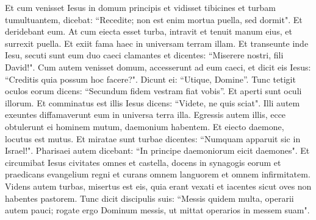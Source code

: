 \begin{biblechapter}
\verse Et cum venisset Iesus in domum principis et vidisset tibicines et turbam tumultuantem, 
\verse dicebat: “Recedite; non est enim mortua puella, sed dormit". Et deridebant eum. 
\verse At cum eiecta esset turba, intravit et tenuit manum eius, et surrexit puella. 
\verse Et exiit fama haec in universam terram illam. 
\verse Et transeunte inde Iesu, secuti sunt eum duo caeci clamantes et dicentes: “Miserere nostri, fili David!". 
\verse Cum autem venisset domum, accesserunt ad eum caeci, et dicit eis Iesus: “Creditis quia possum hoc facere?". Dicunt ei: “Utique, Domine”. 
\verse Tunc tetigit oculos eorum dicens: “Secundum fidem vestram fiat vobis”. 
\verse Et aperti sunt oculi illorum. Et comminatus est illis Iesus dicens: “Videte, ne quis sciat". 
\verse Illi autem exeuntes diffamaverunt eum in universa terra illa. 
\verse Egressis autem illis, ecce obtulerunt ei hominem mutum, daemonium habentem. 
\verse Et eiecto daemone, locutus est mutus. Et miratae sunt turbae dicentes: “Numquam apparuit sic in Israel!". 
\verse Pharisaei autem dicebant: “In principe daemoniorum eicit daemones". 
\verse Et circumibat Iesus civitates omnes et castella, docens in synagogis eorum et praedicans evangelium regni et curans omnem languorem et omnem infirmitatem.  
\verse Videns autem turbas, misertus est eis, quia erant vexati et iacentes sicut oves non habentes pastorem. 
\verse Tunc dicit discipulis suis: “Messis quidem multa, operarii autem pauci; 
\verse rogate ergo Dominum messis, ut mittat operarios in messem suam". 
\end{biblechapter}

